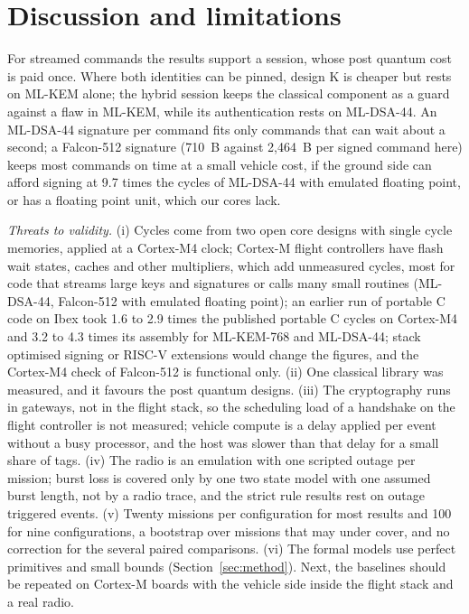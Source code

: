 \documentclass[conference]{IEEEtran}
\begin{document}
\section{Discussion and limitations}
For streamed commands the results support a session, whose post quantum cost is paid once. Where both identities can be pinned, design K is cheaper but rests on ML-KEM alone; the hybrid session keeps the classical component as a guard against a flaw in ML-KEM, while its authentication rests on ML-DSA-44. An ML-DSA-44 signature per command fits only commands that can wait about a second; a Falcon-512 signature (710~B against 2,464~B per signed command here) keeps most commands on time at a small vehicle cost, if the ground side can afford signing at 9.7 times the cycles of ML-DSA-44 with emulated floating point, or has a floating point unit, which our cores lack.

\emph{Threats to validity.} (i) Cycles come from two open core designs with single cycle memories, applied at a Cortex-M4 clock; Cortex-M flight controllers have flash wait states, caches and other multipliers, which add unmeasured cycles, most for code that streams large keys and signatures or calls many small routines (ML-DSA-44, Falcon-512 with emulated floating point); an earlier run of portable C code on Ibex took 1.6 to 2.9 times the published portable C cycles on Cortex-M4 and 3.2 to 4.3 times its assembly for ML-KEM-768 and ML-DSA-44; stack optimised signing \cite{greconici21} or RISC-V extensions \cite{alkim20,fritzmann20} would change the figures, and the Cortex-M4 check of Falcon-512 is functional only. (ii) One classical library was measured, and it favours the post quantum designs. (iii) The cryptography runs in gateways, not in the flight stack, so the scheduling load of a handshake on the flight controller is not measured; vehicle compute is a delay applied per event without a busy processor, and the host was slower than that delay for a small share of tags. (iv) The radio is an emulation with one scripted outage per mission; burst loss is covered only by one two state model with one assumed burst length, not by a radio trace, and the strict rule results rest on outage triggered events. (v) Twenty missions per configuration for most results and 100 for nine configurations, a bootstrap over missions that may under cover, and no correction for the several paired comparisons. (vi) The formal models use perfect primitives and small bounds (Section~\ref{sec:method}). Next, the baselines should be repeated on Cortex-M boards with the vehicle side inside the flight stack and a real radio.
\end{document}
